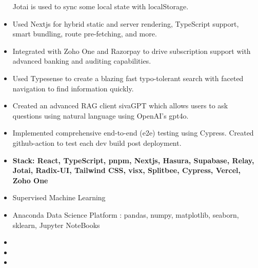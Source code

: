 \documentclass[10pt,a4paper,ragged2e,withhyper]{altacv}
\begin{document}
\begin{paracol}{2}
\begin{itemize}
Jotai is used to sync some local state with localStorage.
\item Used Nextjs for hybrid static and server rendering, TypeScript support, smart bundling, route pre-fetching, and more.
\item Integrated with Zoho One and Razorpay to drive subscription support with advanced banking and auditing capabilities. 
\item Used Typesense to create a blazing fast typo-tolerant search with faceted navigation to find information quickly.
\item Created an advanced RAG client sivaGPT which allows users to ask questions using natural language using OpenAI's gpt4o.
\item Implemented comprehensive end-to-end (e2e) testing using Cypress.
      Created github-action to test each dev build post deployment.
\item \textbf{Stack: React, TypeScript, pnpm, Nextjs, Hasura, Supabase, Relay, Jotai, Radix-UI, Tailwind CSS, visx, Splitbee, Cypress, Vercel, Zoho One}
\end{itemize}

\bigskip

\medskip
{}
\begin{itemize}
\smallskip
\item Supervised Machine Learning
\item Anaconda Data Science Platform : pandas, numpy, matplotlib, seaborn, sklearn, Jupyter NoteBooks
\end{itemize}


\bigskip
{}
\begin{itemize}
\item{}
\smallskip
\item{}
\smallskip
\item{}
\end{itemize}








\end{paracol}
\end{document}
